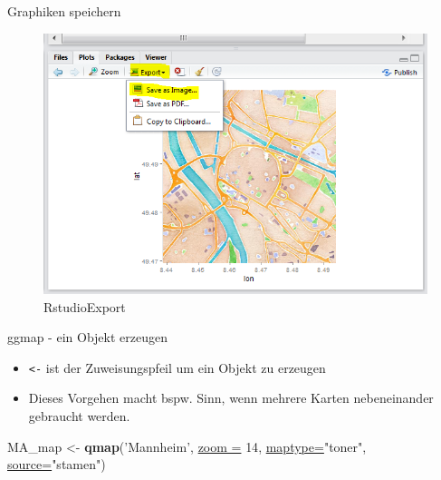 \documentclass[ignorenonframetext,]{beamer}
\newenvironment{Shaded}{\begin{snugshade}}{\end{snugshade}}
\newcommand{\DataTypeTok}[1]{\textcolor[rgb]{0.74,0.68,0.62}{\underline{#1}}}
\newcommand{\DecValTok}[1]{\textcolor[rgb]{0.27,0.67,0.26}{#1}}
\newcommand{\KeywordTok}[1]{\textcolor[rgb]{0.26,0.66,0.93}{\textbf{#1}}}
\newcommand{\NormalTok}[1]{\textcolor[rgb]{0.74,0.68,0.62}{#1}}
\newcommand{\StringTok}[1]{\textcolor[rgb]{0.02,0.61,0.04}{#1}}
\providecommand{\tightlist}{%
  \setlength{\itemsep}{0pt}\setlength{\parskip}{0pt}}
\begin{document}
\begin{frame}{Graphiken speichern}
\protect\hypertarget{graphiken-speichern}{}

\begin{figure}
\centering
\includegraphics{figure/RstudioExport.PNG}
\caption{RstudioExport}
\end{figure}

\end{frame}

\begin{frame}[fragile]{ggmap - ein Objekt erzeugen}
\protect\hypertarget{ggmap---ein-objekt-erzeugen}{}

\begin{itemize}
\tightlist
\item
  \texttt{\textless{}-} ist der Zuweisungspfeil um ein Objekt zu
  erzeugen
\item
  Dieses Vorgehen macht bspw. Sinn, wenn mehrere Karten nebeneinander
  gebraucht werden.
\end{itemize}

\begin{Shaded}
\begin{Highlighting}[]
\NormalTok{MA_map <-}\StringTok{ }\KeywordTok{qmap}\NormalTok{(}\StringTok{'Mannheim'}\NormalTok{, }
               \DataTypeTok{zoom =} \DecValTok{14}\NormalTok{,}
               \DataTypeTok{maptype=}\StringTok{"toner"}\NormalTok{,}
               \DataTypeTok{source=}\StringTok{"stamen"}\NormalTok{)}
\end{Highlighting}
\end{Shaded}

\end{frame}
\end{document}
